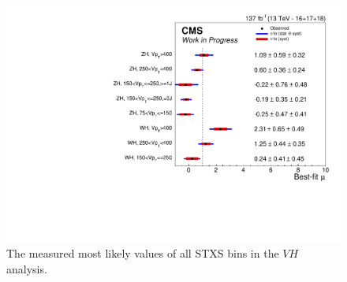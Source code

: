 \begin{figure}
  \centering
  \includegraphics[width=0.8\linewidth]{figures/210308_STXSfine_400split_unblinded_Xbb_8f854f5a_a866aef8/summary_stxs.pdf}
  \caption[Measured STXS values of $V\!H$]{
    The measured most likely values of all STXS bins in the
    $V\!H$ analysis.
  }
  \label{fig:vh-stxs}
\end{figure}

